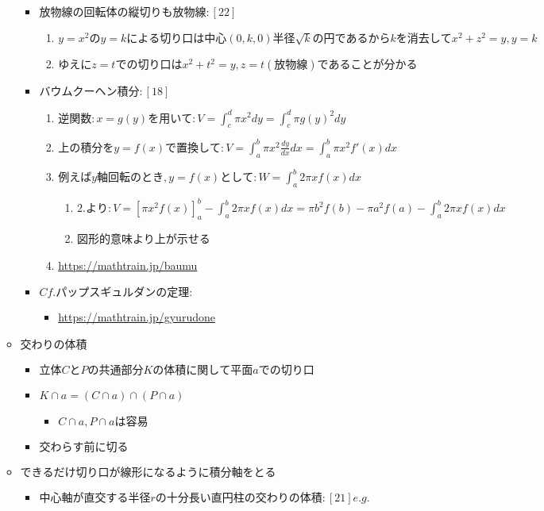 \documentclass[dvipdfmx,uplatex]{jsarticle}
\begin{document}
\begin{itemize}
\begin{itemize}
\begin{itemize}
			\item $ 放物線の回転体の縦切りも放物線:[22]$
			\begin{enumerate}
				\item $ y=x^2のy=kによる切り口は中心(0,k,0)半径 \sqrt{k}の円であるからkを消去してx^2+z^2=y,y=k$
				\item $ ゆえにz=tでの切り口はx^2+t^2=y,z=t(放物線)であることが分かる$
			\end{enumerate}
			\item $ バウムクーヘン積分:[18] $
			\begin{enumerate}
				\item $ 逆関数:x=g(y)を用いて:V= \int^d_c \pi x^2 dy = \int^d_c \pi g(y)^2 dy$
				\item $ 上の積分をy=f(x)で置換して:V= \int^b_a \pi x^2 \frac{dy}{dx} dx = \int^b_a \pi x^2 f'(x)dx$
				\item $ 例えばy軸回転のとき,y = f(x)として:W = \int^b_a 2\pi xf(x)dx$
				\begin{enumerate}
					\item $ 2.より:V = [\pi x^2 f(x)]^b_a - \int^b_a 2 \pi xf(x)dx = \pi b^2 f(b) - \pi a^2 f(a) - \int^b_a 2 \pi xf(x)dx$
					\item 図形的意味より上が示せる
				\end{enumerate}
				\item \url{https://mathtrain.jp/baumu}
			\end{enumerate}
			\item $ Cf. パップスギュルダンの定理: $
			\begin{itemize}
				\item \url{https://mathtrain.jp/gyurudone}
			\end{itemize}
		\end{itemize}
		\item $ 交わりの体積$
		\begin{itemize}
			\item $ 立体CとPの共通部分Kの体積に関して平面aでの切り口$
			\item $ K \cap a = (C \cap a) \cap (P \cap a)$
			\begin{itemize}
				\item $ C \cap a, P \cap a は容易$
			\end{itemize}
			\item $ 交わらす前に切る$
		\end{itemize}
		\item $ できるだけ切り口が線形になるように積分軸をとる$
		\begin{itemize}
			\item $中心軸が直交する半径rの十分長い直円柱の交わりの体積:[21]e.g.$
		\end{itemize}
	\end{itemize}
\end{itemize}
\end{document}
